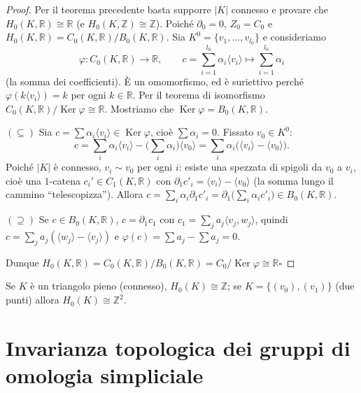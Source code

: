 \begin{proof}
Per il teorema precedente basta supporre $|K|$ connesso e provare che $H_0(K, \mathbb{R}) \cong \mathbb{R}$ (e $H_0(K, \mathbb{Z}) \cong \mathbb{Z}$). Poich\'e $\partial_0 = 0$, $Z_0 = C_0$ e $H_0(K, \mathbb{R}) = C_0(K, \mathbb{R}) / B_0(K, \mathbb{R})$. Sia $K^0 = \{ v_1, \dots, v_{l_0} \}$ e consideriamo
\[
\varphi: C_0(K, \mathbb{R}) \to \mathbb{R}, \qquad c = \sum_{i=1}^{l_0} \alpha_i \langle v_i \rangle \longmapsto \sum_{i=1}^{l_0} \alpha_i
\]
(la somma dei coefficienti). \`E un omomorfismo, ed \`e suriettivo perch\'e $\varphi(k \langle v_i \rangle) = k$ per ogni $k \in \mathbb{R}$. Per il teorema di isomorfismo $C_0(K, \mathbb{R}) / \operatorname{Ker} \varphi \cong \mathbb{R}$. Mostriamo che $\operatorname{Ker} \varphi = B_0(K, \mathbb{R})$.

$(\subseteq)$ Sia $c = \sum \alpha_i \langle v_i \rangle \in \operatorname{Ker} \varphi$, cio\`e $\sum \alpha_i = 0$. Fissato $v_0 \in K^0$:
\[
c = \sum_i \alpha_i \langle v_i \rangle - \Big( \sum_i \alpha_i \Big) \langle v_0 \rangle = \sum_{i} \alpha_i \big( \langle v_i \rangle - \langle v_0 \rangle \big).
\]
Poich\'e $|K|$ \`e connesso, $v_i \sim v_0$ per ogni $i$: esiste una spezzata di spigoli da $v_0$ a $v_i$, cio\`e una $1$-catena $c_i' \in C_1(K, \mathbb{R})$ con $\partial_1 c'_i = \langle v_i \rangle - \langle v_0 \rangle$ (la somma lungo il cammino ``telescopizza''). Allora $c = \sum_i \alpha_i \partial_1 c'_i = \partial_1 \big( \sum_i \alpha_i c'_i \big) \in B_0(K, \mathbb{R})$.

$(\supseteq)$ Se $c \in B_0(K, \mathbb{R})$, $c = \partial_1 c_1$ con $c_1 = \sum_j a_j \langle v_j, w_j \rangle$, quindi $c = \sum_j a_j (\langle w_j \rangle - \langle v_j \rangle)$ e $\varphi(c) = \sum a_j - \sum a_j = 0$.

Dunque $H_0(K, \mathbb{R}) = C_0(K, \mathbb{R}) / B_0(K, \mathbb{R}) = C_0 / \operatorname{Ker} \varphi \cong \mathbb{R}$\hfill$\square$
\end{proof}

\begin{ejemplo}
Se $K$ \`e un triangolo pieno (connesso), $H_0(K) \cong \mathbb{Z}$; se $K = \{ (v_0), (v_1) \}$ (due punti) allora $H_0(K) \cong \mathbb{Z}^2$.
\end{ejemplo}

\section{Invarianza topologica dei gruppi di omologia simpliciale}

